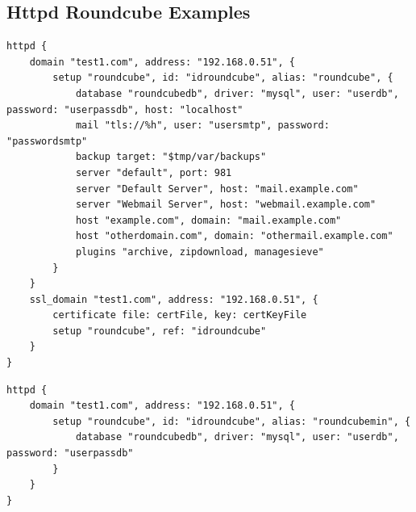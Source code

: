 \subsection{Httpd Roundcube Examples}

\begin{lstlisting}[style=Sscontrol,
label={lst:roundcube_example_script_base},
title={Installs the Roundcube service in the speciefied domain.}]
httpd {
    domain "test1.com", address: "192.168.0.51", {
        setup "roundcube", id: "idroundcube", alias: "roundcube", {
            database "roundcubedb", driver: "mysql", user: "userdb", password: "userpassdb", host: "localhost"
            mail "tls://%h", user: "usersmtp", password: "passwordsmtp"
            backup target: "$tmp/var/backups"
            server "default", port: 981
            server "Default Server", host: "mail.example.com"
            server "Webmail Server", host: "webmail.example.com"
            host "example.com", domain: "mail.example.com"
            host "otherdomain.com", domain: "othermail.example.com"
            plugins "archive, zipdownload, managesieve"
        }
    }
    ssl_domain "test1.com", address: "192.168.0.51", {
        certificate file: certFile, key: certKeyFile
        setup "roundcube", ref: "idroundcube"
    }
}
\end{lstlisting}

\begin{lstlisting}[style=Sscontrol,
label={lst:roundcube_example_script_minimal},
title={Installs the Roundcube service in the speciefied domain with minimal configuration.}]
httpd {
    domain "test1.com", address: "192.168.0.51", {
        setup "roundcube", id: "idroundcube", alias: "roundcubemin", {
            database "roundcubedb", driver: "mysql", user: "userdb", password: "userpassdb"
        }
    }
}
\end{lstlisting}

